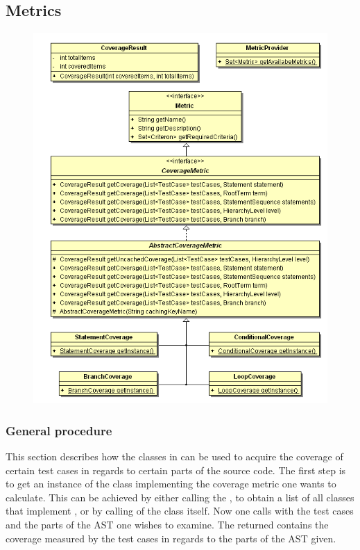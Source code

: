 \subsection{Metrics}

\begin{figure}[hbtp]
 \centering
 \includegraphics[height=0.8\textheight]{images/Metrics/metrics.png}
 \caption{}
 \label{figure:Classes:Metrics:metrics}
\end{figure}

\subsubsection{General procedure} %
This section describes how the classes in  can be used to acquire the coverage of certain test cases in regards to certain parts of the source code. The first step is to get an instance of the class implementing the coverage metric one wants to calculate. This can be achieved by either calling the , to obtain a list of all classes that implement , or by calling  of the class itself. Now one calls  with the test cases and the parts of the AST one wishes to examine. The returned  contains the coverage measured by the test cases in regards to the parts of the AST given.

